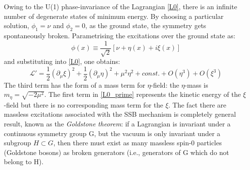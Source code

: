 Owing to the U(1) phase-invariance of the Lagrangian \ref{L0}, there is an infinite number of degenerate states of minimum energy. 
By choosing a particular solution, $\phi_{1} = \nu$ and $\phi_{2} = 0$, as the ground state, the symmetry gets spontaneously broken. Parametrising the excitations over the ground state as:
\begin{equation}
\phi(x) \equiv \frac{1}{\sqrt{2}}[\nu+\eta(x)+i\xi(x)]
\label{phi_expansion}
\end{equation}
and substituting into \ref{L0}, one obtains:
\begin{equation}
\mathcal{L'} = \frac{1}{2}(\partial_{\mu}\xi)^{2} + \frac{1}{2}(\partial_{\mu}\eta)^{2} + \mu^{2}\eta^{2} + const. + O(\eta^{3})+O(\xi^{3})
\label{L0_prime}
\end{equation}
The third term has the form of a mass term for $\eta$-field: the $\eta$-mass is $m_{\eta} = \sqrt{-2\mu^{2}}$. The first term in \ref{L0_prime} represents the kinetic energy of the $\xi$-field but there is no corresponding mass term for the $\xi$. The fact there are massless excitations associated with the SSB mechanism is completely general result, known as the \textit{Goldstone theorem}: if a Lagrangian is invariant under a continuous symmetry group G, but the vacuum is only invariant under a subgroup $H\subset G$, then there must exist as many massless spin-0 particles (Goldstone bosons) as broken generators (i.e., generators of G which do not belong to H).

